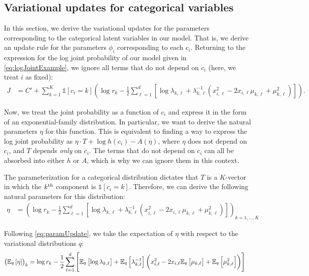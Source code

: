 \documentclass[11pt]{article}
\begin{document}
\subsection{Variational updates for categorical variables}

In this section, we derive the variational updates for the parameters corresponding to the categorical latent variables in our model.
That is, we derive an update rule for the parameters $\phi_i$ corresponding to each $c_i$.
Returning to the expression for the log joint probability of our model given in \eqref{eq:logJointExample}, we ignore all terms that do not depend on $c_i$ (here, we treat $i$ as fixed):
\begin{align}
J
&= C' + \sum_{k=1}^K \mathds{1}[c_i = k] \left( \log r_k - \frac{1}{2}
        \sum_{\ell=1}^d \left[ \log \lambda_{k,\ell} + \lambda_{k,\ell}^{-1} \left( x_{i,\ell}^2 - 2 x_{i,\ell} \mu_{k,\ell} + \mu_{k,\ell}^2 \right) \right]
    \right).
\end{align}

Now, we treat the joint probability as a function of $c_i$ and express it in the form of an exponential-family distribution.
In particular, we want to derive the natural parameters $\eta$ for this function.
This is equivalent to finding a way to express the log joint probability as $\eta \cdot T + \log h(c_i) - A(\eta)$, where $\eta$ does not depend on $c_i$, and $T$ depends \emph{only} on $c_i$.
The terms that do not depend on $c_i$ can all be absorbed into either $h$ or $A$, which is why we can ignore them in this context.

The parameterization for a categorical distribution dictates that $T$ is a $K$-vector in which the $k^{\mathrm{th}}$ component is $\mathds{1}[c_i = k]$.
Therefore, we can derive the following natural parameters for this distribution:
\begin{align}
\eta &= \left(
    \log r_k - \frac{1}{2} \sum_{\ell=1}^d \left[ \log \lambda_{k,\ell} + \lambda_{k,\ell}^{-1} \left( x_{i,\ell}^2 - 2 x_{i,\ell} \mu_{k,\ell} + \mu_{k,\ell}^2 \right) \right]
\right)_{k = 1, \ldots, K}
\end{align}

Following \eqref{eq:paramUpdate}, we take the expectation of $\eta$ with respect to the variational distributions $q$:
\begin{align}
\left( \mathbb{E}_{\substack{q}}\left[ \eta \right] \right)_k
&=
\log r_k - \frac{1}{2} \sum_{\ell=1}^d \left[ \mathbb{E}_{\substack{q}}\left[ \log \lambda_{k,\ell} \right] + \mathbb{E}_{\substack{q}}\left[ \lambda_{k,\ell}^{-1} \right] \left( x_{i,\ell}^2 - 2 x_{i,\ell} \mathbb{E}_{\substack{q}}\left[ \mu_{k,\ell} \right] + \mathbb{E}_{\substack{q}}\left[ \mu_{k,\ell}^2 \right] \right) \right]
\end{align}
\end{document}
